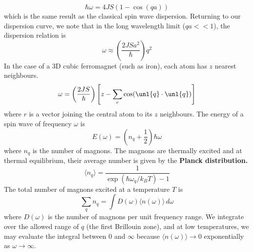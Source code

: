 \documentclass[a4paper, 11pt, normalem]{report}
\begin{document}
\begin{equation}
    \hbar\omega = 4JS(1-\cos(qa))
\end{equation}
which is the same result as the classical spin wave dispersion. 
Returning to our dispersion curve, we note that in the long wavelength limit ($qa << 1$), the dispersion relation is
\begin{equation}
    \omega \approx \left(\frac{2JSa^2}{\hbar}\right)q^2
\end{equation}
In the case of a 3D cubic ferromagnet (such as iron), each atom has $z$ nearest neighbours. 
\begin{equation}
    \omega = \left(\frac{2JS}{\hbar}\right)\left[z - \sum_r\cos(\unl{q}\cdot\unl{q})\right]
\end{equation}
where $r$ is a vector joining the central atom to its $z$ neighbours. 
The energy of a spin wave of frequency $\omega$ is 
\begin{equation}
    E(\omega) = (n_q + \frac12)\hbar\omega
\end{equation}
where $n_q$ is the number of magnons. 
The magnons are thermally excited and at thermal equilibrium, their average number is given by the \textbf{Planck distribution.}
\begin{equation}
    \langle n_q\rangle = \frac{1}{\exp\left(\hbar\omega_q/k_BT\right) - 1}
\end{equation}
The total number of magnons excited at a temperature $T$ is 
\begin{equation}
    \sum_q n_q = \int D(\omega)\langle n(\omega)\rangle\,d\omega
\end{equation}
where $D(\omega)$ is the number of magnons per unit frequency range. 
We integrate over the allowed range of $q$ (the first Brillouin zone), and at low temperatures, we may evaluate the integral between $0$ and $\infty$ because $\langle n(\omega)\rangle \to 0$ exponentially as $\omega\to\infty$.
\end{document}
